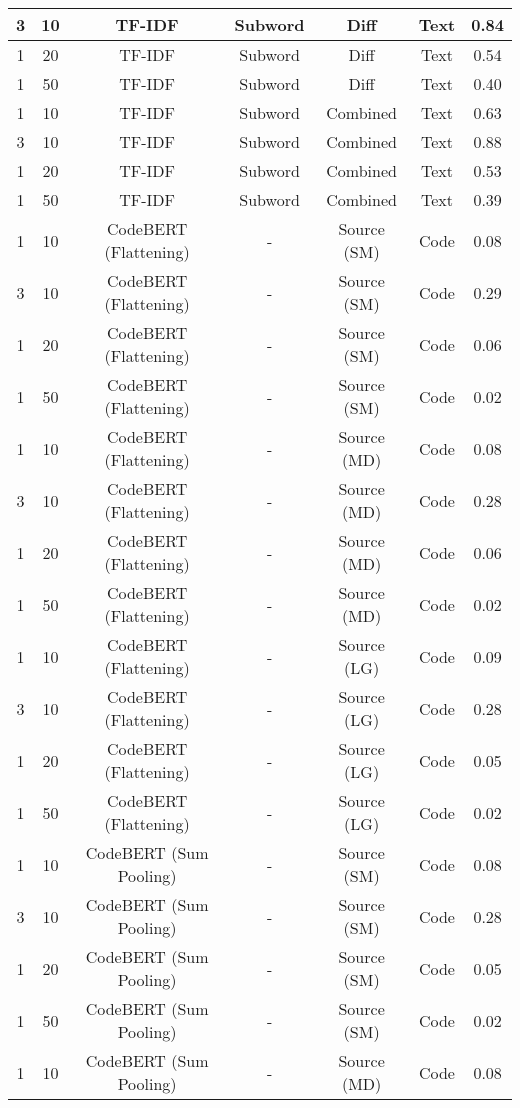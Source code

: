 \begin{longtable}{|c|c|c|c|c|c|c|}
\hline
3 & 10 & TF-IDF & Subword & Diff & Text & 0.84 \\
\hline
1 & 20 & TF-IDF & Subword & Diff & Text & 0.54 \\
\hline
1 & 50 & TF-IDF & Subword & Diff & Text & 0.40 \\
\hline
1 & 10 & TF-IDF & Subword & Combined & Text & 0.63 \\
\hline
3 & 10 & TF-IDF & Subword & Combined & Text & 0.88 \\
\hline
1 & 20 & TF-IDF & Subword & Combined & Text & 0.53 \\
\hline
1 & 50 & TF-IDF & Subword & Combined & Text & 0.39 \\
\hline
1 & 10 & CodeBERT (Flattening) & - & Source (SM) & Code & 0.08 \\
\hline
3 & 10 & CodeBERT (Flattening) & - & Source (SM) & Code & 0.29 \\
\hline
1 & 20 & CodeBERT (Flattening) & - & Source (SM) & Code & 0.06 \\
\hline
1 & 50 & CodeBERT (Flattening) & - & Source (SM) & Code & 0.02 \\
\hline
1 & 10 & CodeBERT (Flattening) & - & Source (MD) & Code & 0.08 \\
\hline
3 & 10 & CodeBERT (Flattening) & - & Source (MD) & Code & 0.28 \\
\hline
1 & 20 & CodeBERT (Flattening) & - & Source (MD) & Code & 0.06 \\
\hline
1 & 50 & CodeBERT (Flattening) & - & Source (MD) & Code & 0.02 \\
\hline
1 & 10 & CodeBERT (Flattening) & - & Source (LG) & Code & 0.09 \\
\hline
3 & 10 & CodeBERT (Flattening) & - & Source (LG) & Code & 0.28 \\
\hline
1 & 20 & CodeBERT (Flattening) & - & Source (LG) & Code & 0.05 \\
\hline
1 & 50 & CodeBERT (Flattening) & - & Source (LG) & Code & 0.02 \\
\hline
1 & 10 & CodeBERT (Sum Pooling) & - & Source (SM) & Code & 0.08 \\
\hline
3 & 10 & CodeBERT (Sum Pooling) & - & Source (SM) & Code & 0.28 \\
\hline
1 & 20 & CodeBERT (Sum Pooling) & - & Source (SM) & Code & 0.05 \\
\hline
1 & 50 & CodeBERT (Sum Pooling) & - & Source (SM) & Code & 0.02 \\
\hline
1 & 10 & CodeBERT (Sum Pooling) & - & Source (MD) & Code & 0.08 \\

\end{longtable}
